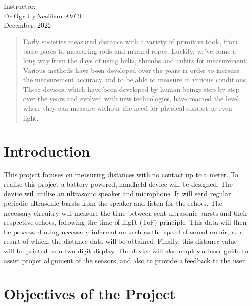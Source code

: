 \documentclass[12pt, a4paper]{article}
\begin{document}
\begin{titlepage}
\begin{center}
            Instructor:\\ Dr.Ogr.Uy.Neslihan AVCU\\

            \vspace*{1 cm}
            December, 2022


        \end{center}

    \end{titlepage}

    \pagebreak
    
    \tableofcontents

    \pagebreak

    \begin{abstract}
        Early societies measured distance with a variety of primitive tools, from basic paces to measuring rods and marked ropes.\cite{abstract} Luckily, we’ve come a long way from the days of using belts, thumbs and cubits for measurement. Various methods have been developed over the years in order to increase the measurement accuracy and to be able to measure in various conditions. These devices, which have been developed by human beings step by step over the years and evolved with new technologies, have reached the level where they can measure without the need for physical contact or even light.
    \end{abstract}

    \section{Introduction}

        This project focuses on measuring distances with no contact up to a meter. To realise this project a battery powered, handheld device will be designed. The device will utilise an ultrasonic speaker and microphone. It will send regular periodic ultrasonic bursts from the speaker and listen for the echoes. The necessary circuitry will measure the time between sent ultrasonic bursts and their respective echoes, following the time of flight (ToF) principle. This data will then be processed using necessary information such as the speed of sound on air, as a result of which, the distance data will be obtained. Finally, this distance value will be printed on a two digit display. The device will also employ a laser guide to assist proper alignment of the sensors, and also to provide a feedback to the user. 


    \section{Objectives of the Project}
\end{document}
